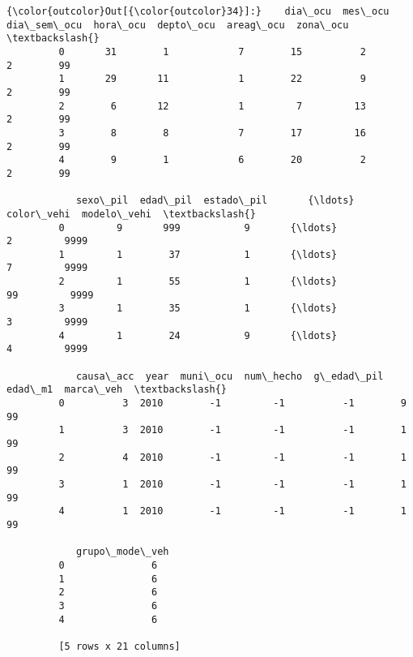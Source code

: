 \documentclass[11pt]{article}
\begin{document}
\begin{Verbatim}[commandchars=\\\{\}]
{\color{outcolor}Out[{\color{outcolor}34}]:}    dia\_ocu  mes\_ocu  dia\_sem\_ocu  hora\_ocu  depto\_ocu  areag\_ocu  zona\_ocu  \textbackslash{}
         0       31        1            7        15          2          2        99   
         1       29       11            1        22          9          2        99   
         2        6       12            1         7         13          2        99   
         3        8        8            7        17         16          2        99   
         4        9        1            6        20          2          2        99   
         
            sexo\_pil  edad\_pil  estado\_pil       {\ldots}        color\_vehi  modelo\_vehi  \textbackslash{}
         0         9       999           9       {\ldots}                 2         9999   
         1         1        37           1       {\ldots}                 7         9999   
         2         1        55           1       {\ldots}                99         9999   
         3         1        35           1       {\ldots}                 3         9999   
         4         1        24           9       {\ldots}                 4         9999   
         
            causa\_acc  year  muni\_ocu  num\_hecho  g\_edad\_pil  edad\_m1  marca\_veh  \textbackslash{}
         0          3  2010        -1         -1          -1        9         99   
         1          3  2010        -1         -1          -1        1         99   
         2          4  2010        -1         -1          -1        1         99   
         3          1  2010        -1         -1          -1        1         99   
         4          1  2010        -1         -1          -1        1         99   
         
            grupo\_mode\_veh  
         0               6  
         1               6  
         2               6  
         3               6  
         4               6  
         
         [5 rows x 21 columns]
\end{Verbatim}
            
\end{document}

